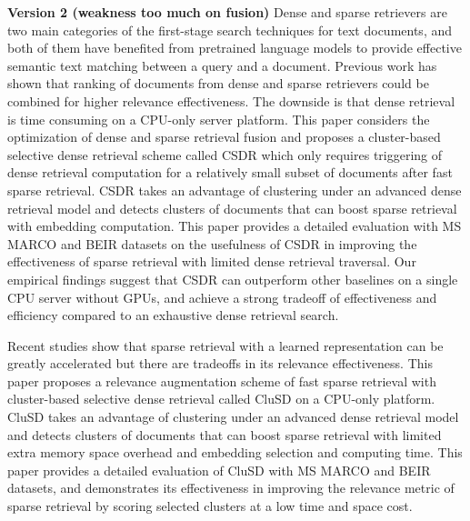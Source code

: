{{\bf Version 2  (weakness too much on fusion)}
Dense and sparse retrievers are two main categories of the
first-stage search techniques for text  documents, and both of them have benefited 
from pretrained language models to provide effective semantic text matching between a query and a document.
Previous work has shown that  ranking of documents from dense and sparse retrievers could be combined for higher relevance effectiveness. 
The downside is that dense retrieval is time consuming on a CPU-only server platform.
This paper considers the optimization of dense and sparse retrieval fusion and 
 proposes a cluster-based selective dense retrieval scheme called CSDR which only requires triggering of dense retrieval 
computation for a relatively small subset of documents after  fast sparse retrieval. 
CSDR takes an advantage of clustering under an advanced  dense retrieval model and
detects clusters of documents that can boost sparse retrieval with  embedding  computation.
This paper provides a detailed evaluation with MS MARCO and BEIR  datasets  
on the usefulness of CSDR in improving the effectiveness of sparse retrieval with limited dense  retrieval
traversal.  Our empirical findings suggest that CSDR can outperform other baselines on a single CPU server 
without GPUs, and achieve a strong tradeoff of effectiveness and efficiency compared to an exhaustive dense retrieval search.
}



Recent studies show that sparse retrieval with a learned representation
can be greatly accelerated but there are  tradeoffs  in its relevance effectiveness.
This paper proposes a relevance augmentation scheme of fast sparse  retrieval with cluster-based selective dense retrieval called CluSD
on  a CPU-only platform.
CluSD takes an advantage of clustering under an advanced  dense retrieval model and
detects clusters of documents that can boost sparse retrieval with  limited  extra memory space overhead and embedding selection and computing time. 
This paper provides a detailed evaluation of CluSD with MS MARCO and BEIR  datasets, 
and demonstrates its effectiveness in improving the relevance metric of sparse retrieval by scoring  selected clusters 
at a low time and space cost.


